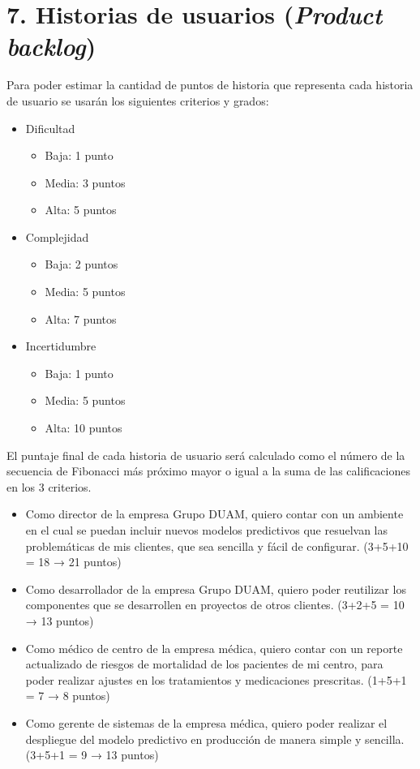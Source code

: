 \documentclass[
11pt, %
]{charter}
\begin{document}
\section{7. Historias de usuarios (\textit{Product backlog})}
\label{sec:backlog}

Para poder estimar la cantidad de puntos de historia que representa cada historia de usuario se usarán los siguientes criterios y grados:

\begin{itemize}
	\item Dificultad
	\begin{itemize}
		\item Baja: 1 punto
		\item Media: 3 puntos
		\item Alta: 5 puntos
	\end{itemize}
	\item Complejidad
	\begin{itemize}
		\item Baja: 2 puntos
		\item Media: 5 puntos
		\item Alta: 7 puntos
	\end{itemize}
	\item Incertidumbre
	\begin{itemize}
		\item Baja: 1 punto
		\item Media: 5 puntos
		\item Alta: 10 puntos
	\end{itemize}
\end{itemize}

El puntaje final de cada historia de usuario será calculado como el número de la secuencia de Fibonacci más próximo mayor o igual a la suma de las calificaciones en los 3 criterios.

\begin{itemize}
	\item Como director de la empresa Grupo DUAM, quiero contar con un ambiente en el cual se puedan incluir nuevos modelos predictivos que resuelvan las problemáticas de mis clientes, que sea sencilla y fácil de configurar. (3+5+10 = 18 → 21 puntos)
	\item Como desarrollador de la empresa Grupo DUAM, quiero poder reutilizar los componentes que se desarrollen en proyectos de otros clientes. (3+2+5 = 10 → 13 puntos)
	\item Como médico de centro de la empresa médica, quiero contar con un reporte actualizado de riesgos de mortalidad de los pacientes de mi centro, para poder realizar ajustes en los tratamientos y medicaciones prescritas. (1+5+1 = 7 → 8 puntos)
	\item Como gerente de sistemas de la empresa médica, quiero poder realizar el despliegue del modelo predictivo en producción de manera simple y sencilla. (3+5+1 = 9 → 13 puntos)
\end{itemize}
\end{document}
